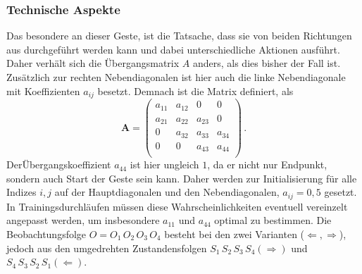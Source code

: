 \subsubsection{Technische Aspekte}
Das besondere an dieser Geste, ist die Tatsache, dass sie von beiden Richtungen aus durchgef\"uhrt werden kann und dabei unterschiedliche Aktionen ausf\"uhrt.
\newline
Daher verh\"alt sich die \"Ubergangsmatrix $A$ anders, als dies bisher der Fall ist. Zus\"atzlich zur rechten Nebendiagonalen ist hier auch die linke Nebendiagonale mit Koeffizienten $a_{ij}$ besetzt. Demnach ist die Matrix definiert, als
\begin{equation}
\mathbf{A} = 
\begin{pmatrix}
a_{11} & a_{12} & 0 & 0\\
 a_{21} & a_{22} & a_{23} & 0\\
0 &  a_{32} & a_{33} & a_{34}\\
0 & 0 & a_{43} & a_{44} \\
\end{pmatrix} \, .
\end{equation}
Der\"Ubergangskoeffizient $a_{44}$ ist hier ungleich $1$, da er nicht nur Endpunkt, sondern auch Start der Geste sein kann. Daher werden zur Initialisierung f\"ur alle Indizes $i, j$ auf der Hauptdiagonalen und den Nebendiagonalen, $a_{ij} = 0,5$ gesetzt. In Trainingsdurchl\"aufen m\"ussen diese Wahrscheinlichkeiten eventuell vereinzelt angepasst werden, um insbesondere $a_{11}$ und $a_{44}$ optimal zu bestimmen. Die Beobachtungsfolge $O = O_1\, O_2\, O_3\, O_4$ besteht bei den zwei Varianten ($\Leftarrow, \Rightarrow$), jedoch aus den umgedrehten Zustandensfolgen $S_1\, S_2\, S_3\, S_4 (\Rightarrow)$ und $S_4\, S_3\, S_2\, S_1 (\Leftarrow)$.